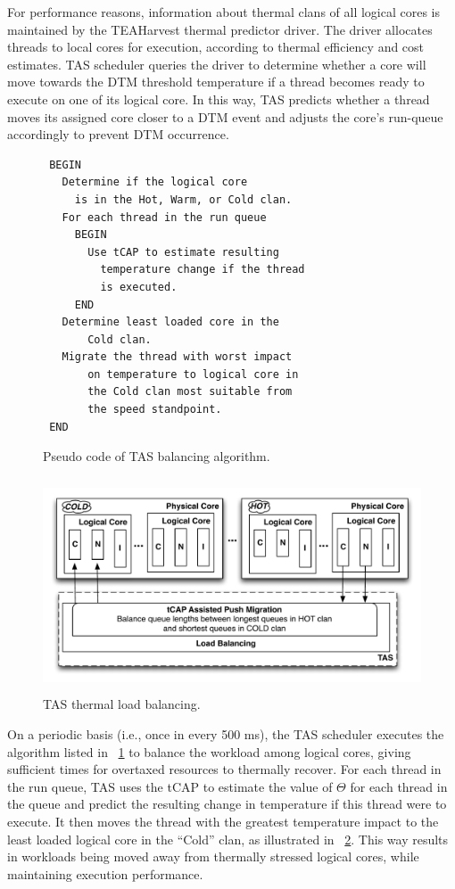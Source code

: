 \documentclass[times, 10pt,twocolumn]{IEEEtran}
\begin{document}
For performance reasons, information about thermal clans of all logical
cores is maintained by the TEAHarvest thermal predictor driver.  The
driver allocates threads to local cores for execution, according to
thermal efficiency and cost estimates.  TAS scheduler queries the driver
to determine whether a core will move towards the DTM threshold
temperature if a thread becomes ready to execute on one of its logical
core.  In this way, TAS predicts whether a thread moves its assigned
core closer to a DTM event and adjusts the core's run-queue accordingly
to prevent DTM occurrence.
{\setlength{\abovecaptionskip}{0ex}
\begin{figure}[t] 
\centering
\begin{verbatim} 
 BEGIN 
   Determine if the logical core 
     is in the Hot, Warm, or Cold clan.  
   For each thread in the run queue 
     BEGIN 
       Use tCAP to estimate resulting 
         temperature change if the thread 
         is executed. 
     END 
   Determine least loaded core in the
       Cold clan.  
   Migrate the thread with worst impact 
       on temperature to logical core in
       the Cold clan most suitable from
       the speed standpoint.  
 END
\end{verbatim}
\caption{Pseudo code of TAS balancing algorithm.}
\label{fig:tascode}
\end{figure}
} 
\begin{figure}[t]
  \centering
  \includegraphics[width=1.0\linewidth,height=2.5in]{thbalance}
  \caption{TAS thermal load balancing.}
  \label{fig:tasbalance}
\end{figure}
On a periodic basis (i.e., once in every 500 ms), the TAS scheduler
executes the algorithm listed in \figurename~\ref{fig:tascode} to
balance the workload among logical cores, giving sufficient times for
overtaxed resources to thermally recover.  For each thread in the run
queue, TAS uses the tCAP to estimate the value of $\Theta$ for each
thread in the queue and predict the resulting change in temperature if
this thread were to execute.  It then moves the thread with the greatest
temperature impact to the least loaded logical core in the ``Cold''
clan, as illustrated in \figurename~\ref{fig:tasbalance}.  This way
results in workloads being moved away from thermally stressed logical
cores, while maintaining execution performance.
\end{document}
